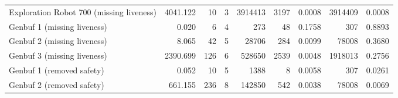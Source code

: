 \begin{tabular}{|l|rr|rr|rr|rr|}
  Exploration Robot 700 (missing liveness) & 4041.122 & 10 & 3 & 3914413 & 3197 & 0.0008 & 3914409 & 0.0008 \\ 
  Genbuf 1 (missing liveness) & 0.020 & 6 & 4 & 273 & 48 & 0.1758 & 307 & 0.8893 \\ 
  Genbuf 2 (missing liveness) & 8.065 & 42 & 5 & 28706 & 284 & 0.0099 & 78008 & 0.3680 \\ 
  Genbuf 3 (missing liveness) & 2390.699 & 126 & 6 & 528650 & 2539 & 0.0048 & 1918013 & 0.2756 \\ 
  Genbuf 1 (removed safety) & 0.052 & 10 & 5 & 1388 & 8 & 0.0058 & 307 & 0.0261 \\ 
  Genbuf 2 (removed safety) & 661.155 & 236 & 8 & 142850 & 542 & 0.0038 & 78008 & 0.0069 \\ 
   \hline
\end{tabular}
